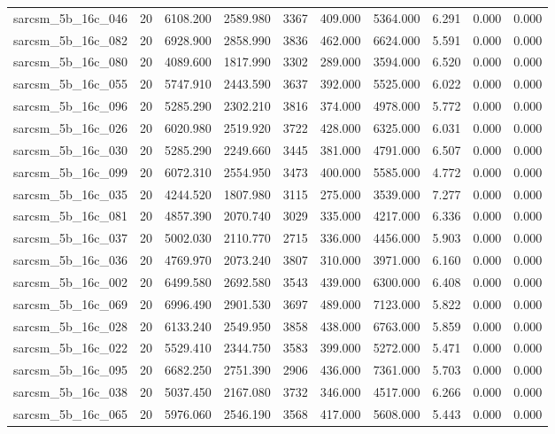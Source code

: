 \begin{tabular}{lrrrrrrrrr}
sarcsm\_5b\_16c\_046 & 20 & 6108.200 & 2589.980 & 3367 & 409.000 & 5364.000 & 6.291 & 0.000 & 0.000 \\
sarcsm\_5b\_16c\_082 & 20 & 6928.900 & 2858.990 & 3836 & 462.000 & 6624.000 & 5.591 & 0.000 & 0.000 \\
sarcsm\_5b\_16c\_080 & 20 & 4089.600 & 1817.990 & 3302 & 289.000 & 3594.000 & 6.520 & 0.000 & 0.000 \\
sarcsm\_5b\_16c\_055 & 20 & 5747.910 & 2443.590 & 3637 & 392.000 & 5525.000 & 6.022 & 0.000 & 0.000 \\
sarcsm\_5b\_16c\_096 & 20 & 5285.290 & 2302.210 & 3816 & 374.000 & 4978.000 & 5.772 & 0.000 & 0.000 \\
sarcsm\_5b\_16c\_026 & 20 & 6020.980 & 2519.920 & 3722 & 428.000 & 6325.000 & 6.031 & 0.000 & 0.000 \\
sarcsm\_5b\_16c\_030 & 20 & 5285.290 & 2249.660 & 3445 & 381.000 & 4791.000 & 6.507 & 0.000 & 0.000 \\
sarcsm\_5b\_16c\_099 & 20 & 6072.310 & 2554.950 & 3473 & 400.000 & 5585.000 & 4.772 & 0.000 & 0.000 \\
sarcsm\_5b\_16c\_035 & 20 & 4244.520 & 1807.980 & 3115 & 275.000 & 3539.000 & 7.277 & 0.000 & 0.000 \\
sarcsm\_5b\_16c\_081 & 20 & 4857.390 & 2070.740 & 3029 & 335.000 & 4217.000 & 6.336 & 0.000 & 0.000 \\
sarcsm\_5b\_16c\_037 & 20 & 5002.030 & 2110.770 & 2715 & 336.000 & 4456.000 & 5.903 & 0.000 & 0.000 \\
sarcsm\_5b\_16c\_036 & 20 & 4769.970 & 2073.240 & 3807 & 310.000 & 3971.000 & 6.160 & 0.000 & 0.000 \\
sarcsm\_5b\_16c\_002 & 20 & 6499.580 & 2692.580 & 3543 & 439.000 & 6300.000 & 6.408 & 0.000 & 0.000 \\
sarcsm\_5b\_16c\_069 & 20 & 6996.490 & 2901.530 & 3697 & 489.000 & 7123.000 & 5.822 & 0.000 & 0.000 \\
sarcsm\_5b\_16c\_028 & 20 & 6133.240 & 2549.950 & 3858 & 438.000 & 6763.000 & 5.859 & 0.000 & 0.000 \\
sarcsm\_5b\_16c\_022 & 20 & 5529.410 & 2344.750 & 3583 & 399.000 & 5272.000 & 5.471 & 0.000 & 0.000 \\
sarcsm\_5b\_16c\_095 & 20 & 6682.250 & 2751.390 & 2906 & 436.000 & 7361.000 & 5.703 & 0.000 & 0.000 \\
sarcsm\_5b\_16c\_038 & 20 & 5037.450 & 2167.080 & 3732 & 346.000 & 4517.000 & 6.266 & 0.000 & 0.000 \\
sarcsm\_5b\_16c\_065 & 20 & 5976.060 & 2546.190 & 3568 & 417.000 & 5608.000 & 5.443 & 0.000 & 0.000 \\

\end{tabular}
